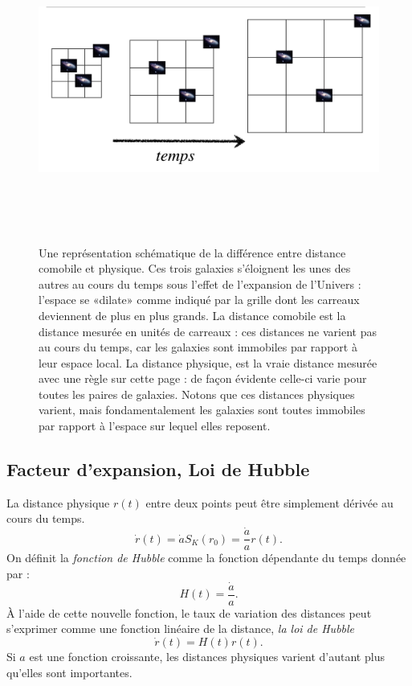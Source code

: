 \begin{figure}[htbp]
	\centering
		\includegraphics[height=10cm]{figs/grille.png}
	\caption[Coordonnées comobiles et expansion]{Une représentation schématique de la différence entre distance comobile et physique. Ces trois galaxies s'éloignent les unes des autres au cours du temps sous l'effet de l'expansion de l'Univers : l'espace se «dilate» comme indiqué par la grille dont les carreaux deviennent de plus en plus grands. La distance comobile est la distance mesurée en unités de carreaux : ces distances ne varient pas au cours du temps, car les galaxies sont immobiles par rapport à leur espace local. La distance physique, est la vraie distance mesurée avec une règle sur cette page : de façon évidente celle-ci varie pour toutes les paires de galaxies. Notons que ces distances physiques varient, mais fondamentalement les galaxies sont toutes immobiles par rapport à l'espace sur lequel elles reposent.}
	\label{f:grille}
\end{figure}

\subsection{Facteur d'expansion, Loi de Hubble}
La distance physique $r(t)$ entre deux points peut être simplement dérivée au cours du temps.
\begin{equation}
\dot r(t)= \dot a S_K(r_0) =\frac{\dot a}{a}r(t).
\end{equation}
On définit la \textit{fonction de Hubble} comme la fonction dépendante du temps donnée par :
\begin{equation}
H(t)=\frac{\dot a}{a}.
\label{e:hubble}
\end{equation}
À l'aide de cette nouvelle fonction, le taux de variation des distances peut s'exprimer comme une fonction linéaire de la distance, \textit{la loi de Hubble}
\begin{equation}
\dot r(t) = H(t) r(t).
\label{e:hubble2}
\end{equation}
Si $a$ est une fonction croissante, les distances physiques varient d'autant plus qu'elles sont importantes.

